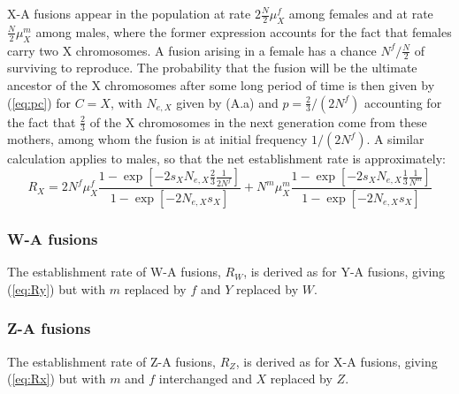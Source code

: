 X-A fusions appear in the population at rate $\text{2}\frac{N}{\text{2}}\mu^f_X$ among females and at rate $\frac{N}{\text{2}}\mu^m_X$ among males, where the former expression accounts for the fact that females carry two X chromosomes. A fusion arising in a female has a chance $N^f/\frac{N}{\text{2}}$ of surviving to reproduce. The probability that the fusion will be the ultimate ancestor of the X chromosomes after some long period of time is then given by (\ref{eq:pc}) for $C = X$, with $N_{e,X}$ given by (A.a) and $p=\frac{\text{2}}{\text{3}}/(\text{2}N^f)$ accounting for the fact that $\frac{\text{2}}{\text{3}}$ of the X chromosomes in the next generation come from these mothers, among whom the fusion is at initial frequency $\text{1}/(\text{2}N^f)$. A similar calculation applies to males, so that the net establishment rate is approximately:
\begin{equation}\label{eq:Rx}
R_X = \text{2}N^f\mu^f_X 
\frac{\text{1}- \exp[-\text{2}s_X N_{e,X}  \frac{\text{2}}{\text{3}} \frac{\text{1}}{\text{2}N^f} ]}{\text{1} - \exp[-\text{2}N_{e,X} s_X]} 
+ N^m\mu^m_X \frac{\text{1}- \exp[-\text{2}s_X N_{e,X}  \frac{\text{1}}{\text{3}} \frac{\text{1}}{N^m}]}{\text{1} - \exp[-\text{2}N_{e,X} s_X]}
\end{equation}

\subsubsection{W-A fusions}
The establishment rate of W-A fusions, $R_W$, is derived as for Y-A fusions, giving (\ref{eq:Ry}) but with $m$ replaced by $f$ and $Y$ replaced by $W$.

\subsubsection{Z-A fusions}
The establishment rate of Z-A fusions, $R_Z$, is derived as for X-A fusions, giving (\ref{eq:Rx}) but with $m$ and $f$ interchanged and $X$ replaced by $Z$.

